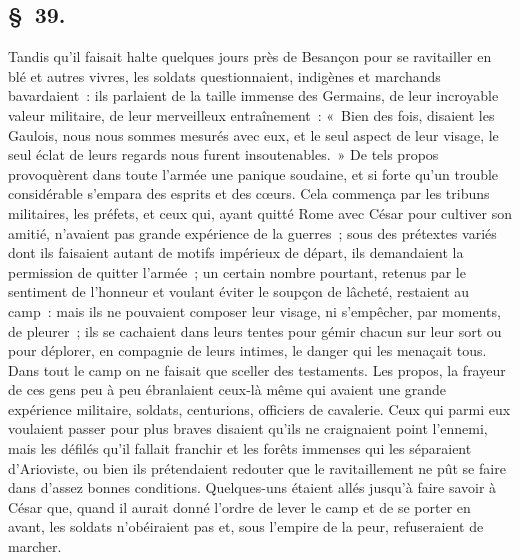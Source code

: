\documentclass[french,twoside]{book} %
\begin{document}
\subsection[{§ 39.}]{ \textsc{§ 39.} }
\noindent Tandis qu’il faisait halte quelques jours près de Besançon pour se ravitailler en blé et autres vivres, les soldats questionnaient, indigènes et marchands bavardaient : ils parlaient de la taille immense des Germains, de leur incroyable valeur militaire, de leur merveilleux entraînement : « Bien des fois, disaient les Gaulois, nous nous sommes mesurés avec eux, et le seul aspect de leur visage, le seul éclat de leurs regards nous furent insoutenables. » De tels propos provoquèrent dans toute l’armée une panique soudaine, et si forte qu’un trouble considérable s’empara des esprits et des cœurs. Cela commença par les tribuns militaires, les préfets, et ceux qui, ayant quitté Rome avec César pour cultiver son amitié, n’avaient pas grande expérience de la guerres ; sous des prétextes variés dont ils faisaient autant de motifs impérieux de départ, ils demandaient la permission de quitter l’armée ; un certain nombre pourtant, retenus par le sentiment de l’honneur et voulant éviter le soupçon de lâcheté, restaient au camp : mais ils ne pouvaient composer leur visage, ni s’empêcher, par moments, de pleurer ; ils se cachaient dans leurs tentes pour gémir chacun sur leur sort ou pour déplorer, en compagnie de leurs intimes, le danger qui les menaçait tous. Dans tout le camp on ne faisait que sceller des testaments. Les propos, la frayeur de ces gens peu à peu ébranlaient ceux-là même qui avaient une grande expérience militaire, soldats, centurions, officiers de cavalerie. Ceux qui parmi eux voulaient passer pour plus braves disaient qu’ils ne craignaient point l’ennemi, mais les défilés qu’il fallait franchir et les forêts immenses qui les séparaient d’Arioviste, ou bien ils prétendaient redouter que le ravitaillement ne pût se faire dans d’assez bonnes conditions. Quelques-uns étaient allés jusqu’à faire savoir à César que, quand il aurait donné l’ordre de lever le camp et de se porter en avant, les soldats n’obéiraient pas et, sous l’empire de la peur, refuseraient de marcher.
\end{document}
